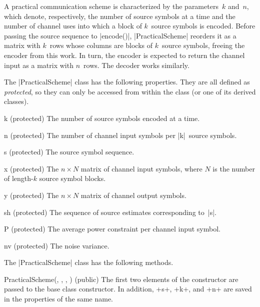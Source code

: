 A practical communication scheme is characterized by the parameters~$k$ and~$n$,
which denote, respectively, the number of source symbols at a time and the
number of channel uses into which a block of $k$~source symbols is encoded.
Before passing the source sequence to |encode()|, |PracticalScheme| reorders it
as a matrix with $k$~rows whose columns are blocks of $k$~source symbols,
freeing the encoder from this work. In turn, the encoder is expected to return
the channel input as a matrix with $n$~rows. The decoder works similarly.

The |PracticalScheme| class has the following properties. They are all defined
as \emph{protected}, so they can only be accessed from within the class (or one
of its derived classes).
\begin{property}{k (protected)}
  The number of source symbols encoded at a time.
\end{property}
\begin{property}{n (protected)}
  The number of channel input symbols per |k|~source symbols.
\end{property}
\begin{property}{s (protected)}
  The source symbol sequence.
\end{property}
\begin{property}{x (protected)}
  The $n \times N$ matrix of channel input symbols, where $N$
  is the number of length-$k$ source symbol blocks. 
\end{property}
\begin{property}{y (protected)}
  The $n \times N$ matrix of channel output symbols. 
\end{property}
\begin{property}{sh (protected)}
  The sequence of source estimates corresponding to~|s|.
\end{property}
\begin{property}{P (protected)}
  The average power constraint per channel input symbol.
\end{property}
\begin{property}{nv (protected)}
  The noise variance.
\end{property}

The |PracticalScheme| class has the following methods.
\begin{method}{PracticalScheme(, , , )
  (public)}
  The first two elements of the constructor are passed to the base class
  constructor. In addition, +s+, +k+, and +n+ are saved in the properties of the
  same name. 
\end{method}

